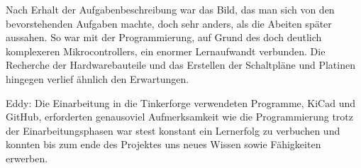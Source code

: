 Nach Erhalt der Aufgabenbeschreibung war das Bild, das man sich von den bevorstehenden Aufgaben machte, doch sehr anders, als die Abeiten später aussahen. So war mit der Programmierung, auf Grund des doch deutlich komplexeren Mikrocontrollers, ein enormer Lernaufwandt verbunden. Die Recherche der Hardwarebauteile und das Erstellen der Schaltpläne und Platinen hingegen verlief ähnlich den Erwartungen.

Eddy: Die Einarbeitung in die Tinkerforge verwendeten Programme, KiCad und GitHub, erforderten genausoviel Aufmerksamkeit wie die Programmierung trotz der Einarbeitungsphasen war stest konstant ein Lernerfolg zu verbuchen und konnten bis zum ende des Projektes uns neues Wissen sowie Fähigkeiten erwerben.